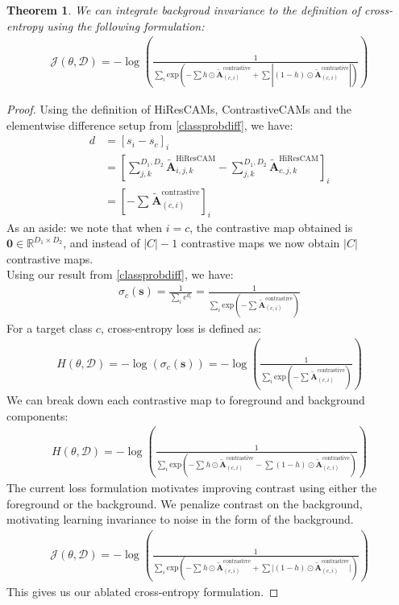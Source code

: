 \documentclass{article}
\theoremstyle{plain}
\newtheorem{theorem}{Theorem}[section]
\theoremstyle{definition}
\theoremstyle{remark}
\begin{document}
\begin{theorem}\label{ace}
	We can integrate backgroud invariance to the definition of cross-entropy using the following formulation:
	\begin{gather}
		\mathcal{J}(\theta, \mathcal{D}) = -\log \left( \frac{1}{\sum_i \text{exp}\left(-\sum h \odot \tilde{\mathcal{\bm{A}}}^{\text{contrastive}}_{(c, i)} + \sum |(1-h) \odot \tilde{\mathcal{\bm{A}}}^{\text{contrastive}}_{(c, i)}|\right)} \right)
	\end{gather}
\end{theorem}
\begin{proof} Using the definition of HiResCAMs, ContrastiveCAMs and the elementwise difference setup from \ref{classprobdiff}, we have:
	\begin{align}
		d &= [s_i - s_c]_i \\
		&= \left[\sum^{D_1,D_2}_{j,k} \tilde{\mathcal{\bm{A}}}_{i,j,k}^{\text{HiResCAM}} - \sum^{D_1,D_2}_{j,k} \tilde{\mathcal{\bm{A}}}_{c,j,k}^{\text{HiResCAM}}\right]_i \\
		&= \left[ -\sum^{}\tilde{\mathcal{\bm{A}}}^{\text{contrastive}}_{(c, i)} \right]_i
	\end{align}
	As an aside: we note that when $i = c$, the contrastive map obtained is $\bm{0} \in \mathbb{R}^{D_1 \times D_2}$, and instead of $|C| - 1$ contrastive maps we now obtain $|C|$ contrastive maps. \newline \\
	Using our result from \ref{classprobdiff}, we have:
	\begin{gather}
		\sigma_c(\bm{s}) = \frac{1}{\sum_i e^{d_i}} = \frac{1}{\sum_i \text{exp}({-\sum^{}\tilde{\mathcal{\bm{A}}}^{\text{contrastive}}_{(c, i)}})}
	\end{gather}
	For a target class $c$, cross-entropy loss is defined as:
	\begin{gather}
		H(\theta, \mathcal{D}) = -\log \left( \sigma_c(\bm{s}) \right) = -\log \left( \frac{1}{\sum_i \text{exp}({-\sum^{}\tilde{\mathcal{\bm{A}}}^{\text{contrastive}}_{(c, i)}})} \right)
	\end{gather}
	We can break down each contrastive map to foreground and background components:
	\begin{gather}
		H(\theta, \mathcal{D}) = -\log \left( \frac{1}{\sum_i \text{exp}\left({-\sum^{}h \odot \tilde{\mathcal{\bm{A}}}^{\text{contrastive}}_{(c, i)} - \sum (1-h) \odot \tilde{\mathcal{\bm{A}}}^{\text{contrastive}}_{(c, i)}}\right)} \right)
	\end{gather}
	The current loss formulation motivates improving contrast using either the foreground or the background. We penalize contrast on the background, motivating learning invariance to noise in the form of the background.
	\begin{gather}
		\mathcal{J}(\theta, \mathcal{D}) = -\log \left( \frac{1}{\sum_i \text{exp}\left({-\sum^{}h \odot \tilde{\mathcal{\bm{A}}}^{\text{contrastive}}_{(c, i)} + \sum |(1-h) \odot \tilde{\mathcal{\bm{A}}}^{\text{contrastive}}_{(c, i)}}|\right)} \right)
	\end{gather}
	This gives us our ablated cross-entropy formulation.
\end{proof}
\end{document}
